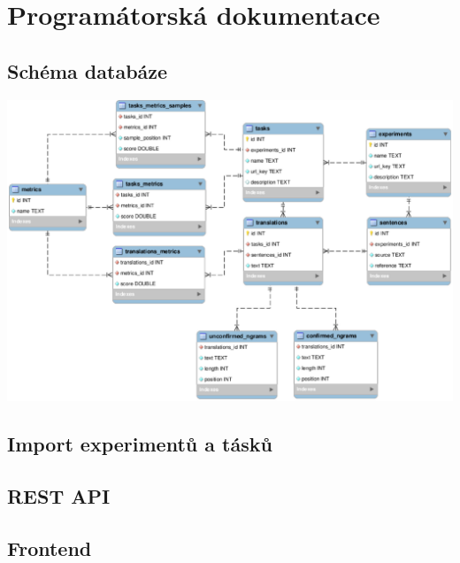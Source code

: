 \chapter{Programátorská dokumentace}
\section{Schéma databáze}
\centerline{\mbox{\includegraphics[width=0.8\paperwidth]{img/schema.eps}}}
\section{Import experimentů a tásků}
\section{REST API}
\section{Frontend}
